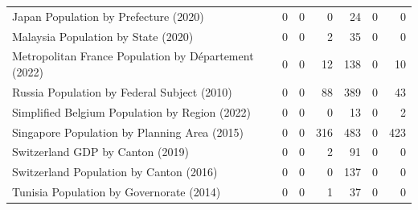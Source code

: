 \begin{tabular}{lrrr|rrr}
                    Japan Population by Prefecture (2020) &                           0 &                           0 &                              0 &                             24 &                              0 &                                 0 \\
                      Malaysia Population by State (2020) &                           0 &                           0 &                              2 &                             35 &                              0 &                                 0 \\
     Metropolitan France Population by Département (2022) &                           0 &                           0 &                             12 &                            138 &                              0 &                                10 \\
              Russia Population by Federal Subject (2010) &                           0 &                           0 &                             88 &                            389 &                              0 &                                43 \\
           Simplified Belgium Population by Region (2022) &                           0 &                           0 &                              0 &                             13 &                              0 &                                 2 \\
             Singapore Population by Planning Area (2015) &                           0 &                           0 &                            316 &                            483 &                              0 &                               423 \\
                         Switzerland GDP by Canton (2019) &                           0 &                           0 &                              2 &                             91 &                              0 &                                 0 \\
                  Switzerland Population by Canton (2016) &                           0 &                           0 &                              0 &                            137 &                              0 &                                 0 \\
                 Tunisia Population by Governorate (2014) &                           0 &                           0 &                              1 &                             37 &                              0 &                                 0 \\

\end{tabular}
